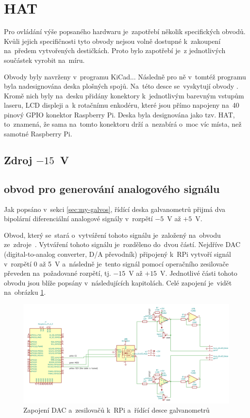 \section{HAT}
Pro ovládání výše popsaného hardwaru je~zapotřebí několik specifických obvodů.
Kvůli jejich specifičnosti tyto obvody nejsou volně dostupné k~zakoupení na~předem vytvořených destičkách. Proto bylo zapotřebí je~z jednotlivých součástek vyrobit na~míru.

Obvody byly navrženy v~programu KiCad...
Následně pro ně v~tomtéž programu byla nadesignována deska plošných spojů. Na~této desce se~vyskytují obvody .
Kromě nich byly na~desku přidány konektory k~jednotlivým barevným vstupům laseru, LCD displeji a~k rotačnímu enkodéru, které jsou přímo napojeny na~40 pinový GPIO konektor Raspberry Pi.
Deska byla designována jako tzv. HAT, to~znamená, že sama na~tomto konektoru drží a~nezabírá o~moc víc místa, než samotné Raspberry Pi.

\subsection{Zdroj $-15$~V}

\subsection{obvod pro generování analogového signálu}
Jak popsáno v~sekci \ref{sec:my-galvos}, řídící deska galvanometrů přijmá dva bipolární diferenciální analogové signály v~rozpětí $-5$~V až $+5$~V.

Obvod, který se~stará o~vytváření tohoto signálu je~založený na~obvodu ze~zdroje~\cite{lasershow-with-real-galvos}.
Vytváření tohoto signálu je~rozděleno do~dvou částí. Nejdříve DAC (digital-to-analog converter, D/A převodník) připojený k~RPi vytvoří signál v~rozpětí 0 až 5~V a~následně je~tento signál pomocí operačního zesilovače převeden na~požadované rozpětí, tj. $-15$~V až $+15$~V.
Jednotlivé části tohoto obvodu jsou blíže popsány v~následujících kapitolách. Celé zapojení je~vidět na~obrázku \ref{fig:dac_board}.
\begin{figure}[!htb]
  \centering
  \includegraphics[width=1\textwidth]{img/dac_board.png} 
  \caption{\label{fig:dac_board}Zapojení DAC a~zesilovačů k~RPi a~řídící desce galvanometrů}
\end{figure}

